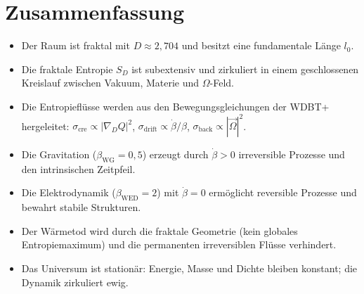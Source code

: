 \section{Zusammenfassung}

\begin{itemize}
    \item Der Raum ist fraktal mit $D \approx 2,704$ und besitzt eine fundamentale Länge $l_0$.
    \item Die fraktale Entropie $S_D$ ist subextensiv und zirkuliert in einem geschlossenen 
          Kreislauf zwischen Vakuum, Materie und $\Omega$-Feld.
    \item Die Entropieflüsse werden aus den Bewegungsgleichungen der WDBT+ hergeleitet:
          $\sigma_{\text{cre}} \propto |\nabla_D Q|^2$, 
          $\sigma_{\text{drift}} \propto \dot{\beta}/\beta$, 
          $\sigma_{\text{back}} \propto |\vec{\Omega}|^2$.
    \item Die Gravitation ($\beta_{\text{WG}} = 0,5$) erzeugt durch $\dot{\beta} > 0$ 
          irreversible Prozesse und den intrinsischen Zeitpfeil.
    \item Die Elektrodynamik ($\beta_{\text{WED}} = 2$) mit $\dot{\beta} = 0$ ermöglicht 
          reversible Prozesse und bewahrt stabile Strukturen.
    \item Der Wärmetod wird durch die fraktale Geometrie (kein globales Entropiemaximum) 
          und die permanenten irreversiblen Flüsse verhindert.
    \item Das Universum ist stationär: Energie, Masse und Dichte bleiben konstant; 
          die Dynamik zirkuliert ewig.
\end{itemize}